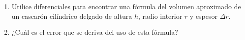 \item 
\begin{enumerate}
    \item[(a)] Utilice diferenciales para encontrar una fórmula del volumen aproximado de un cascarón cilíndrico delgado de altura $h$, radio interior $r$ y espesor $\Delta r$.
    \item[(b)] ¿Cuál es el error que se deriva del uso de esta fórmula?
\end{enumerate}
